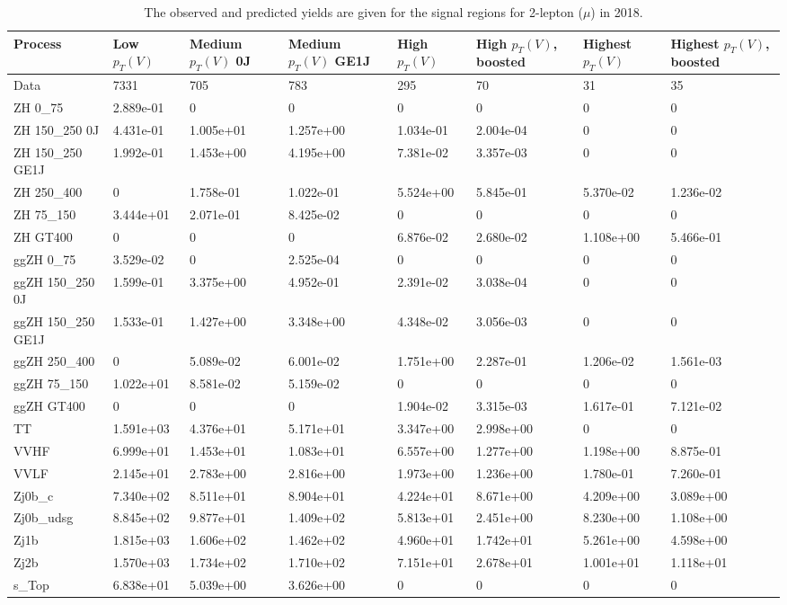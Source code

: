 \begin{table}
\centering
\caption[2018 2-lepton ($\mu$) signal selection yields]{
                  The observed and predicted yields are given for the
                  signal regions for 2-lepton ($\mu$) in 2018.
                  }
{\footnotesize
\begin{tabularx}{\textwidth}{|X|X|X|X|X|X|X|X|}
\hline
Process & Low $p_{T}(V)$ & Medium $p_{T}(V)$ 0J & Medium $p_{T}(V)$ GE1J & High $p_{T}(V)$ & High $p_{T}(V)$, boosted & Highest $p_{T}(V)$ & Highest $p_{T}(V)$, boosted \\
\hline
Data & 7331 & 705 & 783 & 295 & 70 & 31 & 35 \\
\hline
ZH 0\_75 & 2.889e-01 & 0 & 0 & 0 & 0 & 0 & 0 \\
ZH 150\_250 0J & 4.431e-01 & 1.005e+01 & 1.257e+00 & 1.034e-01 & 2.004e-04 & 0 & 0 \\
ZH 150\_250 GE1J & 1.992e-01 & 1.453e+00 & 4.195e+00 & 7.381e-02 & 3.357e-03 & 0 & 0 \\
ZH 250\_400 & 0 & 1.758e-01 & 1.022e-01 & 5.524e+00 & 5.845e-01 & 5.370e-02 & 1.236e-02 \\
ZH 75\_150 & 3.444e+01 & 2.071e-01 & 8.425e-02 & 0 & 0 & 0 & 0 \\
ZH GT400 & 0 & 0 & 0 & 6.876e-02 & 2.680e-02 & 1.108e+00 & 5.466e-01 \\
ggZH 0\_75 & 3.529e-02 & 0 & 2.525e-04 & 0 & 0 & 0 & 0 \\
ggZH 150\_250 0J & 1.599e-01 & 3.375e+00 & 4.952e-01 & 2.391e-02 & 3.038e-04 & 0 & 0 \\
ggZH 150\_250 GE1J & 1.533e-01 & 1.427e+00 & 3.348e+00 & 4.348e-02 & 3.056e-03 & 0 & 0 \\
ggZH 250\_400 & 0 & 5.089e-02 & 6.001e-02 & 1.751e+00 & 2.287e-01 & 1.206e-02 & 1.561e-03 \\
ggZH 75\_150 & 1.022e+01 & 8.581e-02 & 5.159e-02 & 0 & 0 & 0 & 0 \\
ggZH GT400 & 0 & 0 & 0 & 1.904e-02 & 3.315e-03 & 1.617e-01 & 7.121e-02 \\
\hline
TT & 1.591e+03 & 4.376e+01 & 5.171e+01 & 3.347e+00 & 2.998e+00 & 0 & 0 \\
VVHF & 6.999e+01 & 1.453e+01 & 1.083e+01 & 6.557e+00 & 1.277e+00 & 1.198e+00 & 8.875e-01 \\
VVLF & 2.145e+01 & 2.783e+00 & 2.816e+00 & 1.973e+00 & 1.236e+00 & 1.780e-01 & 7.260e-01 \\
Zj0b\_c & 7.340e+02 & 8.511e+01 & 8.904e+01 & 4.224e+01 & 8.671e+00 & 4.209e+00 & 3.089e+00 \\
Zj0b\_udsg & 8.845e+02 & 9.877e+01 & 1.409e+02 & 5.813e+01 & 2.451e+00 & 8.230e+00 & 1.108e+00 \\
Zj1b & 1.815e+03 & 1.606e+02 & 1.462e+02 & 4.960e+01 & 1.742e+01 & 5.261e+00 & 4.598e+00 \\
Zj2b & 1.570e+03 & 1.734e+02 & 1.710e+02 & 7.151e+01 & 2.678e+01 & 1.001e+01 & 1.118e+01 \\
s\_Top & 6.838e+01 & 5.039e+00 & 3.626e+00 & 0 & 0 & 0 & 0 \\
\hline
\end{tabularx}
}
\label{tab:sr-Zmm-2018}
\end{table}

